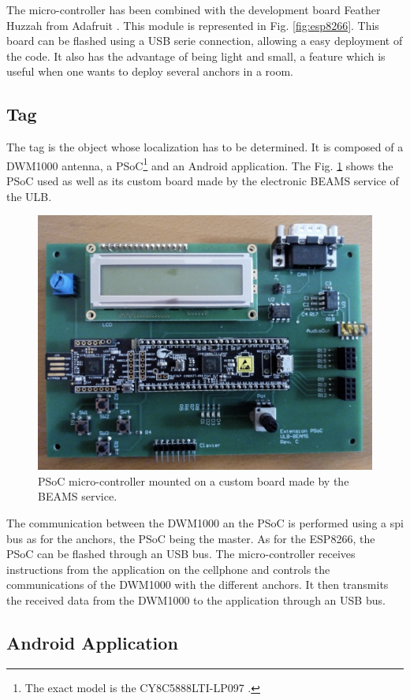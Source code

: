 The micro-controller has been combined with the development board Feather Huzzah from Adafruit \cite{adafruit}. This module is represented in Fig. \ref{fig:esp8266}. This board can be flashed using a USB serie connection, allowing a easy deployment of the code. It also has the advantage of being light and small, a feature which is useful when one wants to deploy several anchors in a room. 

\subsection{Tag}

The tag is the object whose localization has to be determined. It is composed of a DWM1000 antenna, a PSoC\footnote{The exact model is the CY8C5888LTI-LP097 \cite{guyard2019navigation}.} and an Android application. The Fig. \ref{fig:psoc} shows the PSoC used as well as its custom board made by the electronic BEAMS service of the ULB.
\vspace{2mm}

\begin{figure}[H]
	\centering
	\includegraphics[width=.55\linewidth]{Images/psoc.png}
	\caption{PSoC micro-controller mounted on a custom board made by the BEAMS service.}
	\label{fig:psoc}
\end{figure}

The communication between the DWM1000 an the PSoC is performed using a \gls{spi} bus as for the anchors, the PSoC being the master. As for the ESP8266, the PSoC can be flashed through an USB bus. The micro-controller receives instructions from the application on the cellphone and controls the communications of the DWM1000 with the different anchors. It then transmits the received data from the DWM1000 to the application through an USB bus.

\subsection{Android Application}


